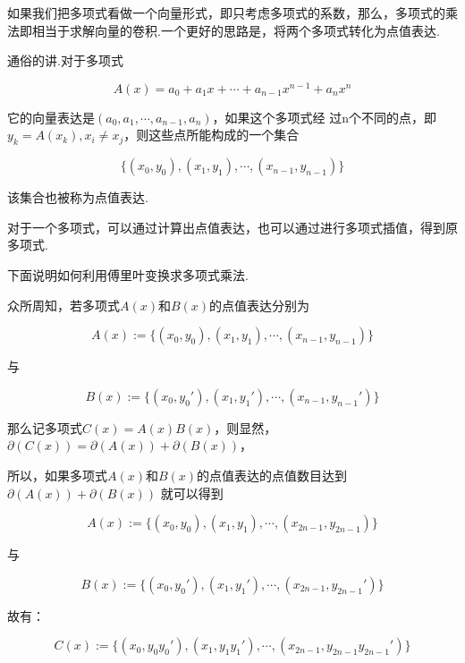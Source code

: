 如果我们把多项式看做一个向量形式，即只考虑多项式的系数，那么，多项式的乘
法即相当于求解向量的卷积.一个更好的思路是，将两个多项式转化为点值表达.

通俗的讲.对于多项式

\begin{equation}
A(x) = a_{0} + a_{1}x + \cdots + a_{n-1}x^{n-1} + a_{n}x^{n}
\end{equation}

它的向量表达是$(a_{0},  a_{1}, \cdots , a_{n-1}, a_{n})$，如果这个多项式经
过n个不同的点，即$y_k = A(x_k), x_i \neq x_j$，则这些点所能构成的一个集合

\begin{equation}
\{(x_0, y_0), (x_1, y_1), \cdots , (x_{n - 1}, y_{n - 1})\}
\end{equation}

该集合也被称为点值表达.

对于一个多项式，可以通过计算出点值表达，也可以通过进行多项式插值，得到原多项式.

下面说明如何利用傅里叶变换求多项式乘法.

众所周知，若多项式$A(x)$和$B(x)$的点值表达分别为

\begin{equation}
A(x) := \{(x_0, y_0), (x_1, y_1), \cdots , (x_{n - 1}, y_{n - 1})\}
\end{equation}

与

\begin{equation}
B(x) := \{(x_0, {y_0}'), (x_1, {y_1}'), \cdots , (x_{n - 1}, {y_{n - 1}}')\}
\end{equation}

那么记多项式$C(x) = A(x)B(x)$，则显然，$\partial (C(x)) = \partial (A(x)) + \partial (B(x))$，

所以，如果多项式$A(x)$和$B(x)$的点值表达的点值数目达到$\partial (A(x)) + \partial (B(x))$
就可以得到

\begin{equation}
A(x) := \{(x_0, y_0), (x_1, y_1), \cdots , (x_{2n - 1}, y_{2n - 1})\}
\end{equation}

与

\begin{equation}
B(x) := \{(x_0, {y_0}'), (x_1, {y_1}'), \cdots , (x_{2n - 1}, {y_{2n - 1}}')\}
\end{equation}

故有：

\begin{equation}
C(x) := \{(x_0, y_0{y_0}'), (x_1, y_1{y_1}'), \cdots , (x_{2n - 1}, y_{2n - 1}{y_{2n - 1}}')\}
\end{equation}

